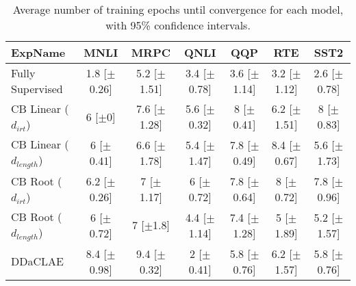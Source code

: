\begin{table*}[ht]
\centering
\begingroup\small
\begin{tabular}{lcccccc}
  \hline
ExpName & MNLI & MRPC & QNLI & QQP & RTE & SST2 \\ 
  \hline
Fully Supervised & 1.8 [$\pm$0.26] & 5.2 [$\pm$1.51] & 3.4 [$\pm$0.78] & 3.6 [$\pm$1.14] & 3.2 [$\pm$1.12] & 2.6 [$\pm$0.78] \\ 
  CB Linear ($d_{irt}$) & 6 [$\pm$0] & 7.6 [$\pm$1.28] & 5.6 [$\pm$0.32] & 8 [$\pm$0.41] & 6.2 [$\pm$1.51] & 8 [$\pm$0.83] \\ 
  CB Linear ($d_{length}$) & 6 [$\pm$0.41] & 6.6 [$\pm$1.78] & 5.4 [$\pm$1.47] & 7.8 [$\pm$0.49] & 8.4 [$\pm$0.67] & 5.6 [$\pm$1.73] \\ 
  CB Root ($d_{irt}$) & 6.2 [$\pm$0.26] & 7 [$\pm$1.17] & 6 [$\pm$0.72] & 7.8 [$\pm$0.64] & 8 [$\pm$0.72] & 7.8 [$\pm$0.96] \\ 
  CB Root ($d_{length}$) & 6 [$\pm$0.72] & 7 [$\pm$1.8] & 4.4 [$\pm$1.14] & 7.4 [$\pm$1.28] & 5 [$\pm$1.89] & 5.2 [$\pm$1.57] \\ 
  DDaCLAE & 8.4 [$\pm$0.98] & 9.4 [$\pm$0.32] & 2 [$\pm$0.41] & 5.8 [$\pm$0.76] & 6.2 [$\pm$1.57] & 5.8 [$\pm$0.76] \\ 
   \hline
\end{tabular}
\endgroup
\caption{Average number of training epochs until convergence for each model, with 95\% confidence intervals.} 
\label{tab:epoch_bert-True}
\end{table*}
